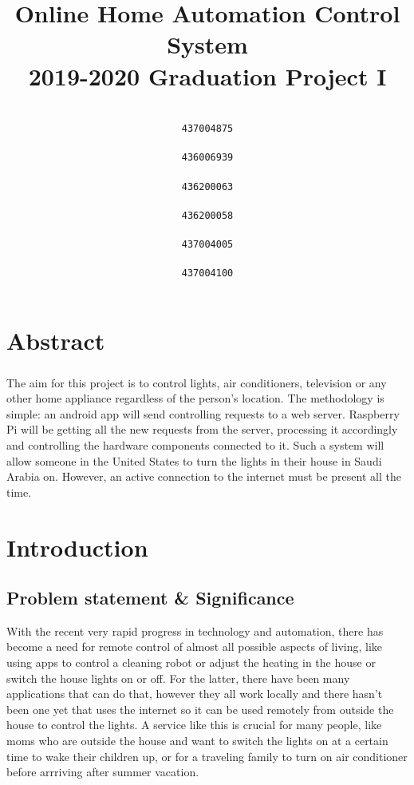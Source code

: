 \documentclass[a4paper, 12pt, oneside]{book}
\date{}
\title{
	Online Home Automation Control System \\
	\large 2019-2020 Graduation Project I }
\author{
	\setcode{utf8}
	\RL{ريم علي الغامدي} 
	\\\texttt{437004875}
	\\[3ex]
	\RL{ساره خالد آل حسين} 
	\\\texttt{436006939}
	\\[3ex]
	\RL{ضحى نضال الزعبي} 
	\\\texttt{436200063}
	\\[3ex]
	\RL{عبير أحمد عزت} 
	\\\texttt{436200058}
	\\[3ex]
	\RL{منى سعود الخثلان} 
	\\\texttt{437004005}
	\\[3ex]
	\RL{نوف عبد الله الدعجاني} 
	\\\texttt{437004100}
}
\begin{document}
	
	
	\maketitle
	\newpage

	
	\tableofcontents
	\newpage	
	\doublespacing
	\newpage
	
	\listoftables
	\newpage
	
	\listoffigures
	\newpage
	




	\chapter*{Abstract}
		\label{sec:intro}
	\paragraph{} The aim for this project is to control lights, air conditioners, television or any other home appliance regardless of the person's location. The methodology is simple: an android app will send controlling requests to a web server. Raspberry Pi will be getting all the new requests from the server, processing it accordingly and controlling the hardware components connected to it. Such a system will allow someone in the United States to turn the lights in their house in Saudi Arabia on. However, an active connection to the internet must be present all the time.
	
	

	\chapter{Introduction}
		\section{Problem statement \& Significance}
		With the recent very rapid progress in technology and automation, there has become a need for remote control of almost all possible aspects of living, like using apps to control a cleaning robot or adjust the heating in the house or switch the house lights on or off. For the latter, there have been many applications that can do that, however they all work locally and there hasn’t been one yet that uses the internet so it can be used remotely from outside the house to control the lights. A service like this is crucial for many people, like moms who are outside the house and want to switch the lights on at a certain time to wake their children up, or for a traveling family to turn on air conditioner before arrriving after summer vacation.
\end{document}
